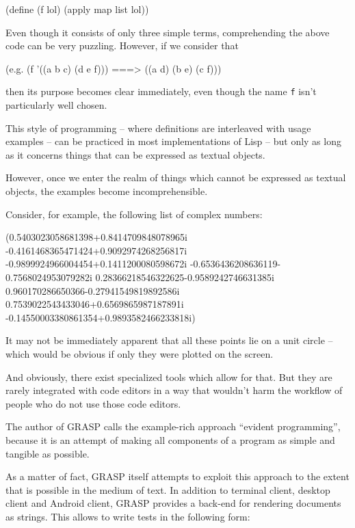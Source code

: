 \documentclass[sigconf]{acmart}
\newenvironment{Snippet}{\Verbatim[samepage=true]}{\endVerbatim}
\begin{document}
\begin{Snippet}
(define (f lol)
  (apply map list lol))
\end{Snippet}

  Even though it consists of only three simple terms,
  comprehending the above code can be very puzzling.
  However, if we consider that

\begin{Snippet}
(e.g.
  (f '((a b c)
       (d e f))) ===> ((a d)
		       (b e)
		       (c f)))
\end{Snippet}

then its purpose becomes clear immediately, even though
the name \texttt{f} isn't particularly well chosen.

This style of programming -- where definitions are
interleaved with usage examples -- can be practiced
in most implementations of Lisp -- but only as long
as it concerns things that can be expressed
as textual objects. 

However, once we enter the realm of things which cannot
be expressed as textual objects, the examples become
incomprehensible.

Consider, for example, the following list of complex numbers:

\begin{Snippet}
(0.5403023058681398+0.8414709848078965i 
-0.4161468365471424+0.9092974268256817i
-0.9899924966004454+0.1411200080598672i
-0.6536436208636119-0.7568024953079282i
 0.28366218546322625-0.9589242746631385i 
 0.960170286650366-0.27941549819892586i
 0.7539022543433046+0.6569865987187891i
-0.14550003380861354+0.9893582466233818i)
\end{Snippet}

It may not be immediately apparent that all these points
lie on a unit circle -- which would be obvious if only they
were plotted on the screen.

And obviously, there exist specialized tools
which allow for that. But they are rarely integrated
with code editors in a way that wouldn't harm
the workflow of people who do not use those code
editors.

The author of GRASP calls the example-rich approach
``evident programming'', because it is an attempt
of making all components of a program as simple
and tangible as possible.

As a matter of fact, GRASP itself attempts to exploit
this approach to the extent that is possible
in the medium of text. In addition to terminal
client, desktop client and Android client,
GRASP provides a back-end for rendering documents
as strings. This allows to write tests in the
following form:
\end{document}
